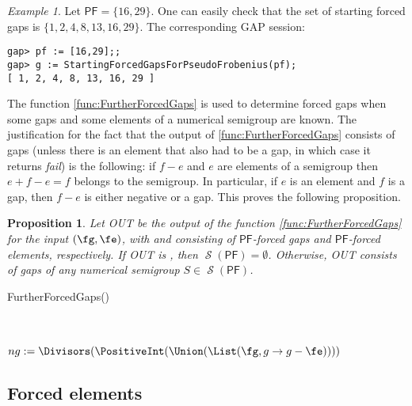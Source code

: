 \documentclass[11pt]{amsart}
\newtheorem{proposition}[theorem]{Proposition}
\theoremstyle{remark}
\newtheorem{example}[theorem]{Example}
\begin{document}
\begin{example}\label{example:starting_forced_gaps}
Let ${\ensuremath{\mathsf{PF}}}=\{16,29\}$. One can easily check that the set of starting forced gaps is $\{1,2,4,8,13,16,29\}$. The corresponding \textsf{GAP} session:
\begin{verbatim}
gap> pf := [16,29];;
gap> g := StartingForcedGapsForPseudoFrobenius(pf);      
[ 1, 2, 4, 8, 13, 16, 29 ]
\end{verbatim}
\end{example}
The function \ref{func:FurtherForcedGaps} is used to determine forced gaps when some gaps and some elements of a numerical semigroup are known.
The justification for the fact that the output of \ref{func:FurtherForcedGaps} consists of gaps (unless there is an element that also had to be a gap, in which case it returns \emph{fail}) is the following: if $f-e$ and $e$ are elements of a semigroup then $e+f-e=f$ belongs to the semigroup. In particular, if $e$ is an element and $f$ is a gap, then $f-e$ is either negative or a gap. 
This proves the following proposition.
\begin{proposition}\label{prop:correction_FurtherForcedGaps}
Let \textsf{OUT} be the output of the function \ref{func:FurtherForcedGaps} for the input  $(\fg,\fe)$, with \fg and \fe consisting of {\ensuremath{\mathsf{PF}}}-forced gaps and {\ensuremath{\mathsf{PF}}}-forced elements, respectively. If \textsf{OUT} is \fail, then $\operatorname{\mathcal{S}}({\ensuremath{\mathsf{PF}}})=\emptyset$. Otherwise, \textsf{OUT} consists of gaps of any numerical semigroup $S\in \operatorname{\mathcal{S}}({\ensuremath{\mathsf{PF}}})$.
\end{proposition}

\begin{function}[ht]\caption{FurtherForcedGaps()\label{func:FurtherForcedGaps}}
\FurtherForcedGapsw{\fg,\fe}\\
 \\
  $ng := \Divisors(\PositiveInt(\Union(\List(\fg, g \to g - \fe))))$\;
  \nl\label{line:conflicts_gaps}
\end{function}  

\subsection{Forced elements}
\label{subsec:forced_elements_pseudo_code}
\end{document}
